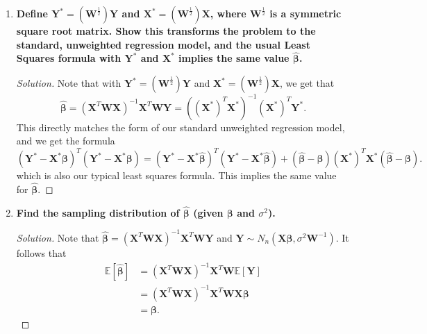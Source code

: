 \documentclass[11pt]{article}
\newenvironment{solution}
  {\renewcommand\qedsymbol{$\blacksquare$}\begin{proof}[Solution]}
  {\end{proof}}
\begin{document}
\begin{enumerate}
\begin{enumerate}
	  \item \textbf{Define $\bm{Y}^* = (\bm{W}^{\frac{1}{2}})\bm{Y}$ and $\bm{X}^* = (\bm{W}^{\frac{1}{2}})\bm{X}$, where $\bm{W}^{\frac{1}{2}}$ is a symmetric square root matrix.
      Show this transforms the problem to the standard, unweighted regression model, and the usual Least Squares formula with $\bm{Y}^*$ and $\bm{X}^*$ implies the same value $\hat{\bm{\beta}}$.}

	  \begin{solution}
	Note that with  $\bm{Y}^* = (\bm{W}^{\frac{1}{2}})\bm{Y}$ and $\bm{X}^* = (\bm{W}^{\frac{1}{2}})\bm{X}$, we get that
	  \[
		\hat{\bm{\beta}} = (\bm{X}^T \bm{WX})^{-1} \bm{X}^T \bm{WY} = ((\bm{X}^*)^T\bm{X}^*)^{-1} (\bm{X}^*)^T \bm{Y}^*.
	  \]
	  This directly matches the form of our standard unweighted regression model, and we get the formula
	  \[
		(\bm{Y}^* - \bm{X^*\beta})^T(\bm{Y}^* - \bm{X^*\beta}) = (\bm{Y}^* - \bm{X}^*\hat{\bm{\beta}})^T(\bm{Y}^* - \bm{X^*\hat{\bm{\beta}}}) + (\hat{\bm{\beta}} - \bm{\beta})(\bm{X}^*)^T\bm{X}^*(\hat{\bm{\beta}} - \bm{\beta}).
	  \]
	  which is also our typical least squares formula. This implies the same value for $\hat{\bm{\beta}}$. 
	  \end{solution}
	  
      \item \textbf{Find the sampling distribution of $\hat{\bm{\beta}}$ (given $\bm{\beta}$ and $\sigma^2$).}
	  \begin{solution}
		Note that $\hat{\bm{\beta}} = (\bm{X}^T \bm{WX})^{-1} \bm{X}^T \bm{WY}$ and  $\bm{Y} \sim N_n(\bm{X\beta}, \sigma^2\bm{W}^{-1})$. It follows that
		\begin{align*}
			\mathbb{E}\left[\hat{\bm{\beta}} \right] &= (\bm{X}^T \bm{WX})^{-1} \bm{X}^T \bm{W}  \mathbb{E}\left[\bm{Y} \right] \\
			&= (\bm{X}^T \bm{WX})^{-1} \bm{X}^T \bm{W} \bm{X\beta} \\
			&= \bm{\beta}.
		\end{align*}


\end{solution}
\end{enumerate}
\end{enumerate}
\end{document}
